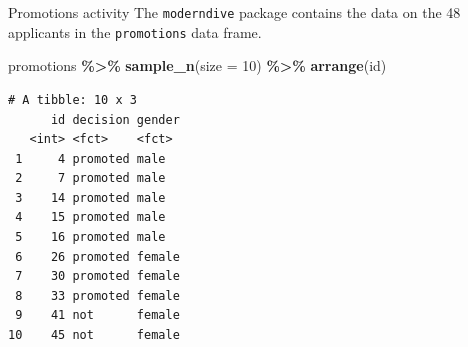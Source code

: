 \documentclass[
  ignorenonframetext,
]{beamer}
\newenvironment{Shaded}{\begin{snugshade}}{\end{snugshade}}
\newcommand{\AttributeTok}[1]{\textcolor[rgb]{0.13,0.29,0.53}{#1}}
\newcommand{\DecValTok}[1]{\textcolor[rgb]{0.00,0.00,0.81}{#1}}
\newcommand{\FunctionTok}[1]{\textcolor[rgb]{0.13,0.29,0.53}{\textbf{#1}}}
\newcommand{\NormalTok}[1]{#1}
\newcommand{\SpecialCharTok}[1]{\textcolor[rgb]{0.81,0.36,0.00}{\textbf{#1}}}
\begin{document}
\begin{frame}[fragile]{Promotions activity}
\protect\hypertarget{promotions-activity-2}{}
The \texttt{moderndive} package contains the data on the 48 applicants
in the \texttt{promotions} data frame.

\tiny

\begin{Shaded}
\begin{Highlighting}[]
\NormalTok{promotions }\SpecialCharTok{\%\textgreater{}\%} 
  \FunctionTok{sample\_n}\NormalTok{(}\AttributeTok{size =} \DecValTok{10}\NormalTok{) }\SpecialCharTok{\%\textgreater{}\%} 
  \FunctionTok{arrange}\NormalTok{(id)}
\end{Highlighting}
\end{Shaded}

\begin{verbatim}
# A tibble: 10 x 3
      id decision gender
   <int> <fct>    <fct> 
 1     4 promoted male  
 2     7 promoted male  
 3    14 promoted male  
 4    15 promoted male  
 5    16 promoted male  
 6    26 promoted female
 7    30 promoted female
 8    33 promoted female
 9    41 not      female
10    45 not      female
\end{verbatim}

\normalsize
\end{frame}
\end{document}
